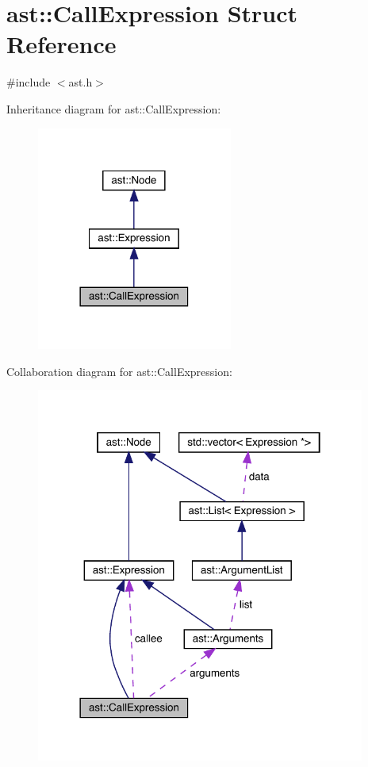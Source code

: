 \hypertarget{structast_1_1_call_expression}{}\section{ast\+:\+:Call\+Expression Struct Reference}
\label{structast_1_1_call_expression}


{\ttfamily \#include $<$ast.\+h$>$}



Inheritance diagram for ast\+:\+:Call\+Expression\+:\nopagebreak
\begin{figure}[H]
\begin{center}
\leavevmode
\includegraphics[width=182pt]{structast_1_1_call_expression__inherit__graph}
\end{center}
\end{figure}


Collaboration diagram for ast\+:\+:Call\+Expression\+:\nopagebreak
\begin{figure}[H]
\begin{center}
\leavevmode
\includegraphics[width=306pt]{structast_1_1_call_expression__coll__graph}
\end{center}
\end{figure}
